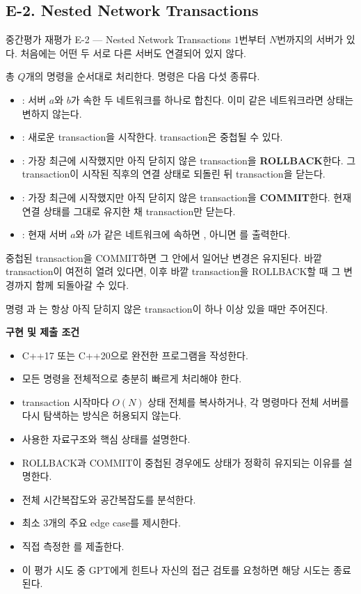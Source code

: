 \subsection{E-2. Nested Network Transactions}
\begin{problembox}{중간평가 재평가 E-2 --- Nested Network Transactions}
$1$번부터 $N$번까지의 서버가 있다. 처음에는 어떤 두 서로 다른 서버도 연결되어 있지 않다.

총 $Q$개의 명령을 순서대로 처리한다. 명령은 다음 다섯 종류다.
\begin{itemize}
\item {}: 서버 $a$와 $b$가 속한 두 네트워크를 하나로 합친다. 이미 같은 네트워크라면 상태는 변하지 않는다.
\item {}: 새로운 transaction을 시작한다. transaction은 중첩될 수 있다.
\item {}: 가장 최근에 시작했지만 아직 닫히지 않은 transaction을 \textbf{ROLLBACK}한다. 그 transaction이 시작된 직후의 연결 상태로 되돌린 뒤 transaction을 닫는다.
\item {}: 가장 최근에 시작했지만 아직 닫히지 않은 transaction을 \textbf{COMMIT}한다. 현재 연결 상태를 그대로 유지한 채 transaction만 닫는다.
\item {}: 현재 서버 $a$와 $b$가 같은 네트워크에 속하면 , 아니면 를 출력한다.
\end{itemize}

중첩된 transaction을 COMMIT하면 그 안에서 일어난 변경은 유지된다. 바깥 transaction이 여전히 열려 있다면, 이후 바깥 transaction을 ROLLBACK할 때 그 변경까지 함께 되돌아갈 수 있다.

명령 과 는 항상 아직 닫히지 않은 transaction이 하나 이상 있을 때만 주어진다.

\textbf{구현 및 제출 조건}
\begin{itemize}
\item C++17 또는 C++20으로 완전한 프로그램을 작성한다.
\item 모든 명령을 전체적으로 충분히 빠르게 처리해야 한다.
\item transaction 시작마다 $O(N)$ 상태 전체를 복사하거나, 각 명령마다 전체 서버를 다시 탐색하는 방식은 허용되지 않는다.
\item 사용한 자료구조와 핵심 상태를 설명한다.
\item ROLLBACK과 COMMIT이 중첩된 경우에도 상태가 정확히 유지되는 이유를 설명한다.
\item 전체 시간복잡도와 공간복잡도를 분석한다.
\item 최소 3개의 주요 edge case를 제시한다.
\item 직접 측정한 를 제출한다.
\item 이 평가 시도 중 GPT에게 힌트나 자신의 접근 검토를 요청하면 해당 시도는 종료된다.
\end{itemize}


\end{problembox}
